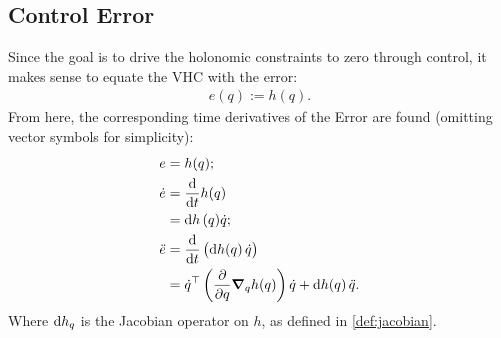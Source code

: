\documentclass[main.tex]{subfiles}
\begin{document}
    \subsection{Control Error}
    Since the goal is to drive the holonomic constraints to zero through control, it makes sense to equate the VHC with the error:
    \begin{align} e( q):= h( q).
    \end{align}
   From here, the corresponding time derivatives of the Error are found (omitting vector symbols for simplicity):
    \begin{align}
    &\begin{aligned}
        {e}&= h( q);
    \end{aligned}\\
    &\begin{aligned}
    \dot{{e}}&=\dv{}{t} h( q)\\&=\dd {h}({q})\dot{{q}};\\
    \end{aligned}\\
    &\begin{aligned}
    \ddot{{e}}&=\dv{}{t}\del{\dd {{h}({q})}\dot{{q}}}\\
    &=\dot{{q}}^\top\del{\pdv{}{ q}\grad_q{{h}({q})}}\dot{{q}}+\dd {{h}({q})}\ddot{{q}}.\label{eq:edd}
    \end{aligned}
    \end{align}
    Where $\dd h_q$ is the Jacobian operator on $h$, as defined in \ref{def:jacobian}.
    
\end{document}
